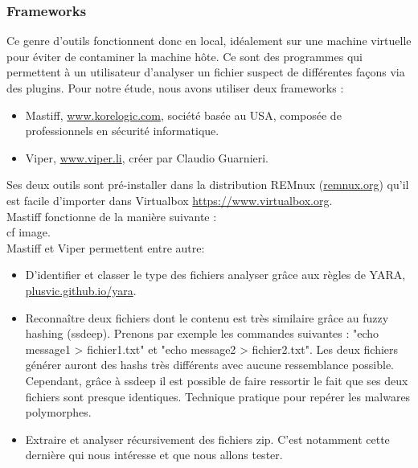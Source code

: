 \documentclass[smallextended]{svjour3}       %
\begin{document}
\subsubsection{Frameworks}
Ce genre d'outils fonctionnent donc en local, idéalement sur une machine virtuelle pour éviter de contaminer la machine hôte. Ce sont des programmes qui permettent à un utilisateur d'analyser un fichier suspect de différentes façons via des plugins. Pour notre étude, nous avons utiliser deux frameworks : 
\label{2.2.2frameworks}
\begin{itemize}
\item Mastiff, \url{www.korelogic.com}, société basée au USA, composée de professionnels en sécurité informatique.
\item Viper, \url{www.viper.li}, créer par Claudio Guarnieri.
\end{itemize}
Ses deux outils sont pré-installer dans la distribution REMnux (\url{remnux.org}) qu'il est facile d'importer dans Virtualbox \url{https://www.virtualbox.org}. \\
Mastiff fonctionne de la manière suivante :\\
cf image.\\
Mastiff et Viper permettent entre autre:
\begin{itemize}
\item D’identifier et classer le type des fichiers analyser grâce aux règles de YARA, \url{plusvic.github.io/yara}.
\item Reconnaître deux fichiers dont le contenu est très similaire grâce au fuzzy hashing (ssdeep). Prenons par exemple les commandes suivantes : "echo message1 > fichier1.txt" et "echo message2 > fichier2.txt". Les deux fichiers générer auront des hashs très différents avec aucune ressemblance possible. Cependant, grâce à ssdeep il est possible de faire ressortir le fait que ses deux fichiers sont presque identiques. Technique pratique pour repérer les malwares polymorphes.
\item Extraire et analyser récursivement des fichiers zip. C'est notamment cette dernière qui nous intéresse et que nous allons tester.
\end{itemize}
\end{document}
